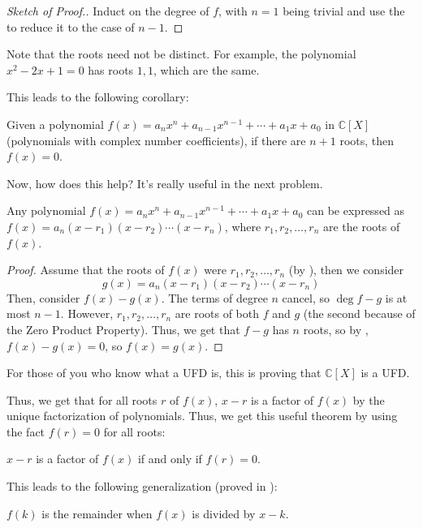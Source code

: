 \documentclass[11pt,titlepage]{scrartcl}
\begin{document}
\begin{proof}[Sketch of Proof.]
Induct on the degree of $f$, with $n=1$ being trivial and use the  to reduce it to the case of $n-1$.
\end{proof}
\begin{remark}
Note that the roots need not be distinct. For example, the polynomial $x^2-2x+1=0$ has roots $1,1$, which are the same. 
\end{remark}
This leads to the following corollary:
\begin{corollary}\label{zerocor}
Given a polynomial $f(x) = a_nx^n +a_{n-1}x^{n-1}+\cdots+a_1x+a_0$ in $\mathbb C[X]$ (polynomials with complex number coefficients), if there are $n+1$ roots, then $f(x)=0$.
\end{corollary}
Now, how does this help? It's really useful in the next problem.
\begin{theorem}\label{ufd}
Any polynomial $f(x) = a_nx^n +a_{n-1}x^{n-1}+\cdots+a_1x+a_0$ can be expressed as $f(x)=a_n(x-r_1)(x-r_2)\cdots(x-r_n)$,
where $r_1,r_2,\ldots,r_n$ are the roots of $f(x)$.
\end{theorem}
\begin{proof}
Assume that the roots of $f(x)$ were $r_1,r_2,\ldots,r_n$ (by ), then we consider
\[g(x)=a_n(x-r_1)(x-r_2)\cdots(x-r_n)\]
Then, consider $f(x)-g(x)$. The terms of degree $n$ cancel, so $\deg f-g$ is at most $n-1$. However, $r_1,r_2,\ldots,r_n$ are roots of both $f$ and $g$ (the second because of the Zero Product Property).  Thus, we get that $f-g$ has $n$ roots, so by , $f(x)-g(x)=0$, so $f(x)=g(x)$.
\end{proof}
\begin{remark}
For those of you who know what a UFD is, this is proving that $\mathbb C[X]$ is a UFD.
\end{remark}
Thus, we get that for all roots $r$ of $f(x)$, $x-r$ is a factor of $f(x)$ by the unique factorization of polynomials. Thus, we get this useful theorem by using the fact $f(r)=0$ for all roots:
\begin{theorem}\label{facthm}
$x-r$ is a factor of $f(x)$ if and only if $f(r)=0$.
\end{theorem}
This leads to the following generalization (proved in ):
\begin{theorem}\label{remthm}
$f(k)$ is the remainder when $f(x)$ is divided by $x-k$.
\end{theorem}
\end{document}
